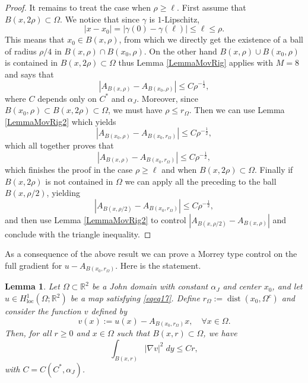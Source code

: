 \documentclass[12pt]{article}
\newtheorem{lemma}[theorem]{Lemma}
\theoremstyle{definition}
\theoremstyle{remark}
\numberwithin{equation}{section}
\DeclareMathOperator{\dist}{dist}
\newcommand{\R}{\mathbb{R}}
\begin{document}
\begin{proof}
    It remains to treat the case when  $\rho \geq \ell$.  First assume that $B(x,2\rho)\subset \Omega$. We notice that  since $\gamma$ is $1$-Lipschitz,
    \[|x-x_0|=|\gamma(0)-\gamma(\ell)|\leq \ell \leq \rho.\]
 This means that $x_0 \in B(x,\rho)$, from which we directly get the  existence of  a ball of radius $\rho/4$ in $B(x,\rho)\cap B(x_0,\rho)$. On the other hand  $B(x,\rho)\cup B(x_0,\rho)$ is contained in $B(x,2\rho)\subset \Omega$ thus  Lemma \ref{LemmaMovRig} applies with $M=8$ and  says  that 
    \[|A_{B(x,\rho)}-A_{B(x_0,\rho)}|\leq C\rho^{-\frac{1}{2}},\]
    where $C$ depends only on $C^*$ and $\alpha_J$.  Moreover, since $B(x_0,\rho) \subset B(x,2\rho)\subset \Omega$, we  must have  $\rho \leq r_\Omega$.  Then we can use Lemma \ref{LemmaMovRig2} which yields
      \[|A_{B(x_0,\rho)}-A_{B(x_0,r_\Omega)}|\leq C\rho^{-\frac{1}{2}},\]
    which all together proves that 
    \[|A_{B(x,\rho)}-A_{B(x_0,r_\Omega)}|\leq C\rho^{-\frac{1}{2}},\]
    which finishes the proof in the case $\rho \geq \ell$ and when $B(x,2\rho)\subset \Omega$. Finally if $B(x,2\rho)$ is not contained in $\Omega$ we can apply all the preceding to the ball $B(x,\rho/2)$, yielding 
    \[|A_{B(x,\rho/2)}-A_{B(x_0,r_\Omega)}|\leq C\rho^{-\frac{1}{2}},\]
  and then use Lemma   \ref{LemmaMovRig2} to control    $|A_{B(x,\rho/2)}-A_{B(x,\rho)}|$ and conclude with the triangle inequality.
\end{proof}

As a consequence of the above result we can prove a Morrey type control on the full gradient for  $u-A_{B(x_0,r_\Omega)}$. Here is the statement.
 
\begin{lemma}
    \label{morraycontrol1}
    Let $\Omega \subset \R^2$ be a John domain with constant $\alpha_J$ and center $x_0$, and let $u \in H^1_{\mathrm{loc}}(\Omega;\R^2)$ be a map satisfying \eqref{eqeq17}.    Define  $r_\Omega:= \dist(x_0,\Omega^c)$ and consider the function  $v$ defined by    
    \[v(x):=u(x)-A_{B(x_0,r_\Omega)} x, \quad  \forall x \in \Omega.\] 
    Then, for all $r  \geq 0$ and $x\in \Omega$ such that $B(x,r)\subset\Omega$, we have
    \[\int_{B(x,r)}|\nabla v|^2 \;dy \leq C r,\]
    with $C=C( C^*,\alpha_J)$.
\end{lemma}
\end{document}
